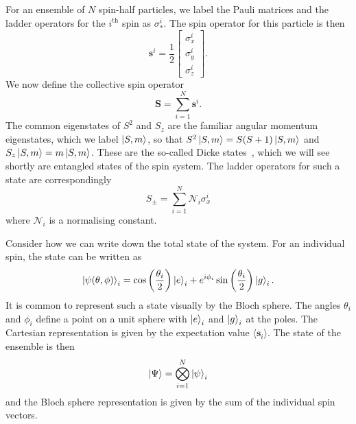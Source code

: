 For an ensemble of $N$ spin-half particles, we label the Pauli matrices and the
ladder operators for the $i^\text{th}$ spin as $\sigma_*^i$. The spin operator
for this particle is then
%
\begin{equation}
  \mathbf{s}^i = \frac{1}{2}\begin{bmatrix} \sigma^i_x \\ \sigma^i_y \\ \sigma^i_z
\end{bmatrix}.
\end{equation}
%
We now define the collective spin operator
%
\begin{equation}
  \mathbf{S} = \sum_{i=1}^N \mathbf{s}^i.
\end{equation}
%
The common eigenstates of $S^2$ and $S_z$ are the familiar angular
momentum eigenstates, which we label $\ket{S,m}$, so that $S^2 \ket{S,m} =
S(S+1)\ket{S, m}$ and $S_z \ket{S,m} = m\ket{S, m}$. These are the so-called
Dicke states~\cite{PhysRev.93.99}, which we will see shortly are entangled
states of the spin system. The ladder operators for such a state are
correspondingly~\cite{Binney}
%
\begin{equation}
  S_\pm = \sum_{i=1}^N \mathcal{N}_i \sigma_x^i
\end{equation}
%
where  $\mathcal{N}_i$ is a normalising constant.

Consider how we can write down the total state of the system. For an individual
spin, the state can be written as
%
\begin{equation}
  \ket{\psi(\theta, \phi)}_i = \cos\left(\frac{\theta_i}{2}\right)\ket{e}_i +
  e^{i\phi_i}\sin\left(\frac{\theta_i}{2}\right)\ket{g}_i.
  \label{eqn:blochspin}
\end{equation}
%
It is common to represent such a state visually by the Bloch sphere.
The angles $\theta_i$ and $\phi_i$ define a point on a unit sphere
with $\ket{e}_i$ and $\ket{g}_i$ at the poles. The Cartesian
representation is given by the expectation value $\langle \mathbf{s}_i
\rangle$.
%
The state of the ensemble is then
%
\begin{equation}
  \ket{\Psi} = \bigotimes_{i=1}^N \ket{\psi}_i
\end{equation}
%
and the Bloch sphere representation is given by the sum of the individual spin
vectors.


